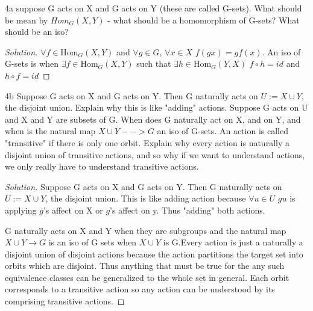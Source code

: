 \documentclass{article}
\newcommand{\Hom}[0]{\text{Hom}}
\newenvironment{solution}
{\renewcommand\qedsymbol{$\blacksquare$}\begin{proof}[Solution]}
{\end{proof}}
\begin{document}
\bigskip

\begin{PROB}{4a}\label{Problem 4a.}
    suppose G acts on X and G acts on Y (these are called G-sets). What should be mean by $Hom_G(X, Y)$ - what should be a homomorphism of G-sets? What should be an iso?
\end{PROB}
\begin{solution}
    $\forall f \in \Hom_G(X, Y)$ and $\forall g \in G$, $\forall x \in X$ $f(gx) = gf(x)$. An iso of G-sets is when $\exists f \in \Hom_G(X, Y)$ such that $\exists h \in  \Hom_G(Y, X)$ $f \circ h = id$ and $h \circ f = id$
\end{solution}

\bigskip

\begin{PROB}{4b}\label{Problem 4b.}
    Suppose G acts on X and G acts on Y. Then G naturally acts on $U := X \cup Y$, the disjoint union. Explain why this is like "adding" actions. Suppose G acts on U and X and Y are subsets of G. When does G naturally act on X, and on Y, and when is the natural map $X \cup Y --> G$ an iso of G-sets. An action is called "transitive" if there is only one orbit. Explain why every action is naturally a disjoint union of transitive actions, and so why if we want to understand actions, we only really have to understand
    transitive actions.
\end{PROB}
\begin{solution}
    Suppose G acts on X and G acts on Y. Then G naturally acts on $U := X \cup Y$, the disjoint union. This is like adding action because $\forall u \in U$ $gu$ is applying $g$'s affect on X or $g$'s affect on y. Thus "adding" both actions.

    G naturally acts on X and Y when they are subgroups and the natural map $X \cup Y \to G$ is an iso of G sets when $X \cup Y$ is G.Every action is just a naturally a disjoint union of disjoint actions because the action partitions the target set into orbits which are disjoint. Thus anything that must be true for the any such equivalence classes can be generalized to the whole set in general. Each orbit corresponds to a transitive action so any action can be understood by its comprising transitive actions.
\end{solution}

\bigskip
\end{document}
